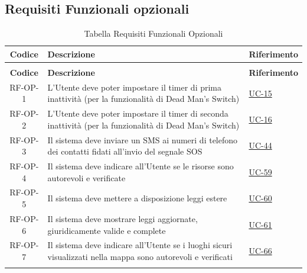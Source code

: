\documentclass[a4paper,12pt]{article}
\begin{document}

\subsection{Requisiti Funzionali opzionali} \label{subsection:requisiti_funzionali_opzionali}
\begin{center}
\renewcommand{\arraystretch}{1.5}
\begin{longtable}{|c|p{8.5cm}|>{\centering\arraybackslash}p{4cm}|}

\hline
\rowcolor{gray!60}
\textbf{Codice} & \textbf{Descrizione} & \textbf{Riferimento} \\
\hline
\endfirsthead
\caption[]{Tabella Requisiti Funzionali opzionali (continua)} \\
\hline
\rowcolor{gray!60}
\textbf{Codice} & \textbf{Descrizione} & \textbf{Riferimento} \\
\hline
\endhead

\rowcolor{gray!20}
RF-OP-1 & L'Utente deve poter impostare il timer di prima inattività (per la funzionalità di Dead Man's Switch) & \hyperref[sec:UC-15]{UC-15} \\
\hline
\rowcolor{white}
RF-OP-2 & L'Utente deve poter impostare il timer di seconda inattività (per la funzionalità di Dead Man's Switch) & \hyperref[sec:UC-16]{UC-16} \\
\hline
\rowcolor{gray!20}
RF-OP-3 & Il sistema deve inviare un SMS ai numeri di telefono dei contatti fidati all'invio del segnale SOS & \hyperref[sec:UC-44]{UC-44} \\
\hline
\rowcolor{white}
RF-OP-4 & Il sistema deve indicare all'Utente se le risorse sono autorevoli e verificate & \hyperref[sec:UC-59]{UC-59} \\
\hline
\rowcolor{gray!20}
RF-OP-5 & Il sistema deve mettere a disposizione leggi estere & \hyperref[sec:UC-60]{UC-60} \\
\hline
\rowcolor{white}
RF-OP-6 & Il sistema deve mostrare leggi aggiornate, giuridicamente valide e complete & \hyperref[sec:UC-61]{UC-61} \\
\hline
\rowcolor{gray!20}
RF-OP-7 & Il sistema deve indicare all'Utente se i luoghi sicuri visualizzati nella mappa sono autorevoli e verificati & \hyperref[sec:UC-66]{UC-66} \\
\hline

\caption{Tabella Requisiti Funzionali Opzionali} \label{tab:requisiti_funzionali_opzionali} \\
\end{longtable}
\end{center}
\end{document}
